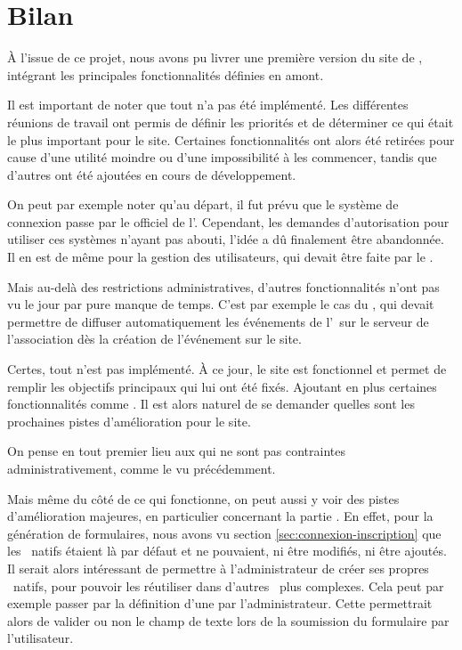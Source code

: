 \chapter{Bilan}

À l’issue de ce projet, nous avons pu livrer une première version du site de \ofni, intégrant les principales fonctionnalités définies en amont.
\bigskip

Il est important de noter que tout n'a pas été implémenté. Les différentes réunions de travail ont permis de définir les priorités et de déterminer ce qui était le plus important pour le site. Certaines fonctionnalités ont alors été retirées pour cause d'une utilité moindre ou d'une impossibilité à les commencer, tandis que d'autres ont été ajoutées en cours de développement.

On peut par exemple noter qu'au départ, il fut prévu que le système de connexion passe par le  officiel de l'\univ. Cependant, les demandes d'autorisation pour utiliser ces systèmes n'ayant pas abouti, l'idée a dû finalement être abandonnée. Il en est de même pour la gestion des utilisateurs, qui devait être faite par le .

Mais au-delà des restrictions administratives, d'autres fonctionnalités n'ont pas vu le jour par pure manque de temps. C'est par exemple le cas du , qui devait permettre de diffuser automatiquement les événements de l'\ofni\ sur le serveur  de l'association dès la création de l'événement sur le site.
\bigskip

Certes, tout n'est pas implémenté. À ce jour, le site est fonctionnel et permet de remplir les objectifs principaux qui lui ont été fixés. Ajoutant en plus certaines fonctionnalités comme \game. Il est alors naturel de se demander quelles sont les prochaines pistes d'amélioration pour le site.

On pense en tout premier lieu aux  qui ne sont pas contraintes administrativement, comme le  vu précédemment.

Mais même du côté de ce qui fonctionne, on peut aussi y voir des pistes d'amélioration majeures, en particulier concernant la partie . En effet, pour la génération de formulaires, nous avons vu section \ref{sec:connexion-inscription} que les \formwidget\ natifs étaient là par défaut et ne pouvaient, ni être modifiés, ni être ajoutés. Il serait alors intéressant de permettre à l'administrateur de créer ses propres \formwidget\ natifs, pour pouvoir les réutiliser dans d'autres \formwidget\ plus complexes. Cela peut par exemple passer par la définition d'une  par l'administrateur. Cette  permettrait alors de valider ou non le champ de texte lors de la soumission du formulaire par l'utilisateur.

